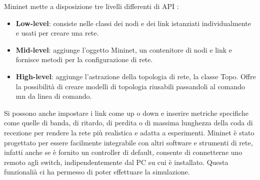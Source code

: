\newline Mininet mette a disposizione tre livelli differenti di API \cite{introMin}:
\begin{itemize}
\item \textbf{Low-level}: consiste nelle classi dei nodi e dei link istanziati individualmente e usati per creare una rete.
\item \textbf{Mid-level}: aggiunge l'oggetto Mininet, un contenitore di nodi e link e fornisce metodi per la configurazione di rete.
\item \textbf{High-level}: aggiunge l'astrazione della topologia di rete, la classe Topo. Offre la possibilità di creare modelli di topologia riusabili passandoli al comando mn da linea di comando.
\end{itemize}
Si possono anche impostare i link come up o down e inserire metriche specifiche 
come quelle di banda, di ritardo, di perdita o di massima lunghezza della coda di recezione per rendere la rete più realistica e adatta a esperimenti.
\newline Mininet è stato progettato per essere facilmente integrabile con altri software e strumenti di rete,
infatti anche se è fornito un controller di default, consente di connetterne uno remoto agli switch, indipendentemente dal PC su cui è installato.
Questa funzionalià ci ha permesso di poter effettuare la simulazione.
